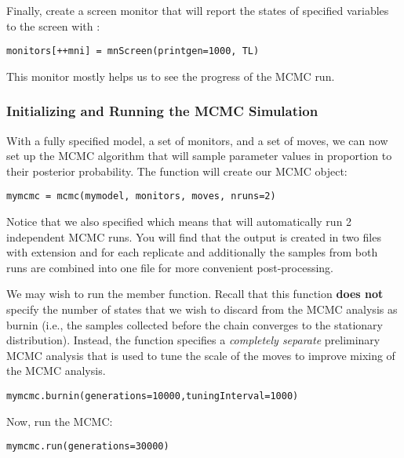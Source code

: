 Finally, create a screen monitor that will report the states of specified variables to the screen with :
{\tt \begin{snugshade*}
\begin{lstlisting}
monitors[++mni] = mnScreen(printgen=1000, TL)
\end{lstlisting}
\end{snugshade*}}
This monitor mostly helps us to see the progress of the MCMC run.

\subsubsection{Initializing and Running the MCMC Simulation}

With a fully specified model, a set of monitors, and a set of moves, we can now set up the MCMC algorithm that will sample parameter values in proportion to their posterior probability. 
The  function will create our MCMC object:
{\tt \begin{snugshade*}
\begin{lstlisting}
mymcmc = mcmc(mymodel, monitors, moves, nruns=2)
\end{lstlisting}
\end{snugshade*}}
Notice that we also specified  which means that \RevBayes will automatically run 2 independent MCMC runs.
You will find that the output is created in two files with extension  and  for each replicate and additionally the samples from both runs are combined into one file for more convenient post-processing.

We may wish to run the  member function.
Recall that this function \textbf{does not} specify the number of states that we wish to discard from the MCMC analysis as burnin (i.e., the samples collected before the chain converges to the stationary distribution).  
Instead, the  function specifies a \textit{completely separate} preliminary MCMC analysis that is used to tune the scale of the moves to improve mixing of the MCMC analysis.
{\tt \begin{snugshade*}
\begin{lstlisting}
mymcmc.burnin(generations=10000,tuningInterval=1000)
\end{lstlisting}
\end{snugshade*}}


Now, run the MCMC:
{\tt \begin{snugshade*}
\begin{lstlisting}
mymcmc.run(generations=30000)
\end{lstlisting}
\end{snugshade*}}

